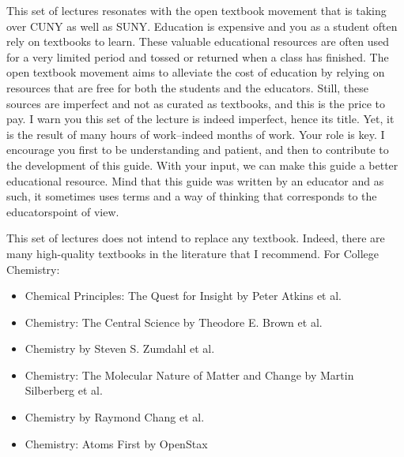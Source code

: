 \documentclass[main.tex]{subfiles}
\begin{document}
\begin{fullwidth}
\begin{multicols*}{2}
This set of lectures resonates with the open textbook movement that is taking over CUNY as well as SUNY. Education is expensive and you as a student often rely on textbooks to learn. These valuable educational resources are often used for a very limited period and tossed or returned when a class has finished. The open textbook movement aims to alleviate the cost of education by relying on resources that are free for both the students and the educators. Still, these sources are imperfect and not as curated as textbooks, and this is the price to pay. I warn you this set of the lecture is indeed imperfect, hence its title. Yet, it is the result of many hours of work--indeed months of work. Your role is key. I encourage you first to be understanding and patient, and then to contribute to the development of this guide. With your input, we can make this guide a better educational resource. Mind that this guide was written by an educator and as such, it sometimes uses terms and a way of thinking that corresponds to the educators\textquotesingle point of view.

This set of lectures does not intend to replace any textbook. Indeed, there are many high-quality textbooks in the literature that I recommend. For College Chemistry:
\begin{small}\begin{itemize}[label=]
\setlength\itemsep{0.5em}
\item Chemical Principles: The Quest for Insight by Peter Atkins et al.
\item Chemistry: The Central Science by Theodore E. Brown et al.
\item Chemistry by Steven S. Zumdahl et al.
\item Chemistry: The Molecular Nature of Matter and Change by Martin Silberberg et al.
\item Chemistry by Raymond Chang et al.
\item Chemistry: Atoms First by OpenStax
\end{itemize}\end{small}


\end{multicols*}
\end{fullwidth}
\end{document}
